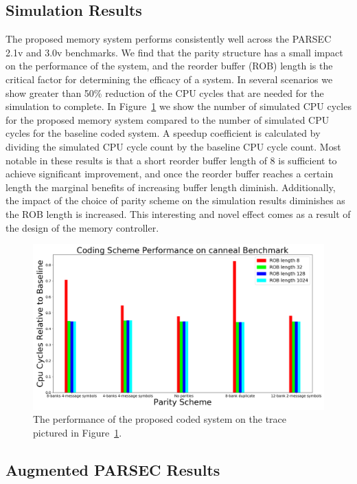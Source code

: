 \subsection{Simulation Results}
\label{sec:results}
The proposed memory system performs consistently well across the PARSEC 2.1v and 3.0v benchmarks. We find that the parity structure has a small impact on the performance of the system, and the reorder buffer (ROB) length is  the critical factor for determining the efficacy of a system. In several scenarios we show greater than 50\% reduction of the CPU cycles that are needed for the simulation to complete. In Figure~\ref{fig:canneal_results} we show the number of simulated CPU cycles for the proposed memory system compared to the number of simulated CPU cycles for the baseline coded system. A speedup coefficient is calculated by dividing the simulated CPU cycle count by the baseline CPU cycle count. Most notable in these results is that a short reorder buffer length of 8 is sufficient to achieve significant improvement, and once the reorder buffer reaches a certain length the marginal benefits of increasing buffer length diminish. Additionally, the impact of the choice of parity scheme on the simulation results diminishes as the ROB length is increased. This interesting and novel effect comes as a result of the design of the memory controller.

\begin{figure}[h!]
		\includegraphics[width=\linewidth]{figures/canneal_results.png}
		\caption{The performance of the proposed coded system on the trace pictured in Figure~\ref{fig:canneal_results}.}
		\label{fig:canneal_results}
\end{figure}
		

\subsection{Augmented PARSEC Results}
\label{sec:aug_results}

